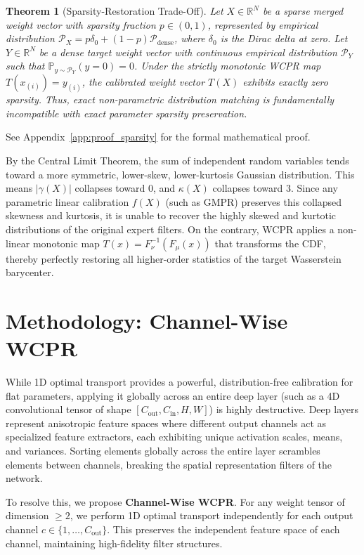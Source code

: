 \documentclass{article}
\theoremstyle{plain}
\newtheorem{theorem}{Theorem}[section]
\theoremstyle{definition}
\theoremstyle{remark}
\begin{document}
\begin{theorem}[Sparsity-Restoration Trade-Off]
\label{thm:sparsity}
  Let $X \in \mathbb{R}^N$ be a sparse merged weight vector with sparsity fraction $p \in (0, 1)$, represented by empirical distribution $\mathcal{P}_X = p \delta_0 + (1-p) \mathcal{P}_{\mathrm{dense}}$, where $\delta_0$ is the Dirac delta at zero. Let $Y \in \mathbb{R}^N$ be a dense target weight vector with continuous empirical distribution $\mathcal{P}_Y$ such that $\mathbb{P}_{y \sim \mathcal{P}_Y}(y = 0) = 0$. Under the strictly monotonic WCPR map $T(x_{(i)}) = y_{(i)}$, the calibrated weight vector $T(X)$ exhibits exactly zero sparsity. Thus, exact non-parametric distribution matching is fundamentally incompatible with exact parameter sparsity preservation.
\end{theorem}
See Appendix~\ref{app:proof_sparsity} for the formal mathematical proof.

By the Central Limit Theorem, the sum of independent random variables tends toward a more symmetric, lower-skew, lower-kurtosis Gaussian distribution. This means $|\gamma(X)|$ collapses toward 0, and $\kappa(X)$ collapses toward 3. Since any parametric linear calibration $f(X)$ (such as GMPR) preserves this collapsed skewness and kurtosis, it is unable to recover the highly skewed and kurtotic distributions of the original expert filters. On the contrary, WCPR applies a non-linear monotonic map $T(x) = F_{\nu}^{-1}(F_{\mu}(x))$ that transforms the CDF, thereby perfectly restoring all higher-order statistics of the target Wasserstein barycenter.

\section{Methodology: Channel-Wise WCPR}
\label{sec:method}

While 1D optimal transport provides a powerful, distribution-free calibration for flat parameters, applying it globally across an entire deep layer (such as a 4D convolutional tensor of shape $[C_{\text{out}}, C_{\text{in}}, H, W]$) is highly destructive. Deep layers represent anisotropic feature spaces where different output channels act as specialized feature extractors, each exhibiting unique activation scales, means, and variances. Sorting elements globally across the entire layer scrambles elements between channels, breaking the spatial representation filters of the network.

To resolve this, we propose \textbf{Channel-Wise WCPR}. For any weight tensor of dimension $\geq 2$, we perform 1D optimal transport independently for each output channel $c \in \{1, \dots, C_{\text{out}}\}$. This preserves the independent feature space of each channel, maintaining high-fidelity filter structures.
\end{document}
